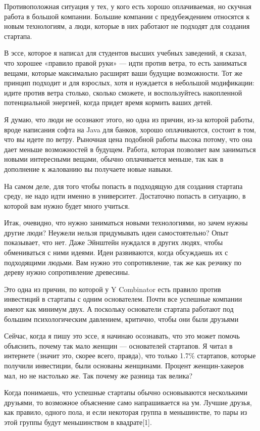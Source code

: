 \documentclass[ebook,12pt,oneside,openany]{memoir}
\begin{document}
Противоположная ситуация у тех, у кого есть хорошо оплачиваемая, но
скучная работа в большой компании. Большие компании с предубеждением
относятся к новым технологиям, а люди, которые в них работают не
подходят для создания стартапа.

В эссе, которое я написал для студентов высших учебных заведений, я
сказал, что хорошее «правило правой руки» — идти против ветра, то есть
заниматься вещами, которые максимально расширят ваши будущие
возможности. Тот же принцип подходит и для взрослых, хотя и нуждается
в небольшой модификации: идите против ветра столько, сколько сможете,
и воспользуйтесь накопленной потенциальной энергией, когда придет
время кормить ваших детей.

Я думаю, что люди не осознают этого, но одна из причин, из-за которой
работы, вроде написания софта на Java для банков, хорошо оплачиваются,
состоит в том, что вы идете по ветру. Рыночная цена подобной работы
высока потому, что она дает меньше возможностей в будущем. Работа,
которая позволяет вам заниматься новыми интересными вещами, обычно
оплачивается меньше, так как в дополнение к жалованию вы получаете
новые навыки.

На самом деле, для того чтобы попасть в подходящую для создания
стартапа среду, не надо идти именно в университет. Достаточно попасть
в ситуацию, в которой вам нужно будет много учиться.

Итак, очевидно, что нужно заниматься новыми технологиями, но зачем
нужны другие люди? Неужели нельзя придумывать идеи самостоятельно?
Опыт показывает, что нет. Даже Эйнштейн нуждался в других людях, чтобы
обмениваться с ними идеями. Идеи развиваются, когда обсуждаешь их с
подходящими людьми. Вам нужно это сопротивление, так же как резчику по
дереву нужно сопротивление древесины.

Это одна из причин, по которой у Y Combinator есть правило против
инвестиций в стартапы с одним основателем. Почти все успешные компании
имеют как минимум двух. А поскольку основатели стартапа работают под
большим психологическим давлением, критично, чтобы они были друзьями

Сейчас, когда я пишу это эссе, я начинаю осознавать, что это может
помочь объяснить, почему так мало женщин — основателей стартапов. Я
читал в интернете (значит это, скорее всего, правда), что только 1.7\%
стартапов, которые получили инвестиции, были основаны женщинами.
Процент женщин-хакеров мал, но не настолько же. Так почему же разница
так велика?

Когда понимаешь, что успешные стартапы обычно основываются несколькими
друзьями, то возможное объяснение само напрашивается на ум. Лучшие
друзья, как правило, одного пола, и если некоторая группа в
меньшинстве, то пары из этой группы будут меньшинством в квадрате[1].
\end{document}
